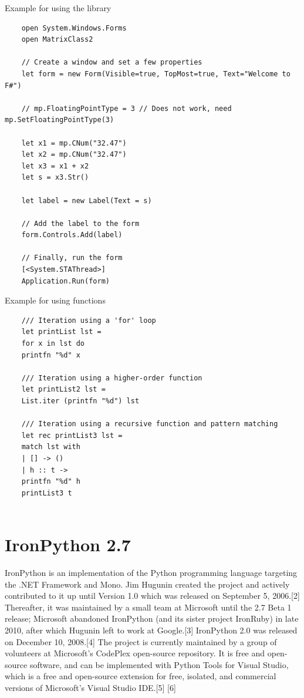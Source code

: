 	
	
	\vpara
	Example for using the library
	
	\begin{lstlisting}
	open System.Windows.Forms
	open MatrixClass2
	
	// Create a window and set a few properties
	let form = new Form(Visible=true, TopMost=true, Text="Welcome to F#")
	
	// mp.FloatingPointType = 3 // Does not work, need mp.SetFloatingPointType(3)
	
	let x1 = mp.CNum("32.47")
	let x2 = mp.CNum("32.47")
	let x3 = x1 + x2
	let s = x3.Str()
	
	let label = new Label(Text = s)
	
	// Add the label to the form
	form.Controls.Add(label)
	
	// Finally, run the form
	[<System.STAThread>]
	Application.Run(form)
	\end{lstlisting}
	
	
	
	
	\vpara
	Example for using functions
	
	\begin{lstlisting}
	/// Iteration using a 'for' loop
	let printList lst = 
	for x in lst do
	printfn "%d" x
	
	/// Iteration using a higher-order function
	let printList2 lst = 
	List.iter (printfn "%d") lst
	
	/// Iteration using a recursive function and pattern matching
	let rec printList3 lst =
	match lst with
	| [] -> ()
	| h :: t ->
	printfn "%d" h
	printList3 t
	
	\end{lstlisting}
	
	
	


\newpage
\section{IronPython 2.7}
IronPython is an implementation of the Python programming language targeting the .NET Framework and Mono. Jim Hugunin created the project and actively contributed to it up until Version 1.0 which was released on September 5, 2006.[2] Thereafter, it was maintained by a small team at Microsoft until the 2.7 Beta 1 release; Microsoft abandoned IronPython (and its sister project IronRuby) in late 2010, after which Hugunin left to work at Google.[3] IronPython 2.0 was released on December 10, 2008.[4] The project is currently maintained by a group of volunteers at Microsoft's CodePlex open-source repository. It is free and open-source software, and can be implemented with Python Tools for Visual Studio, which is a free and open-source extension for free, isolated, and commercial versions of Microsoft's Visual Studio IDE.[5] [6]

